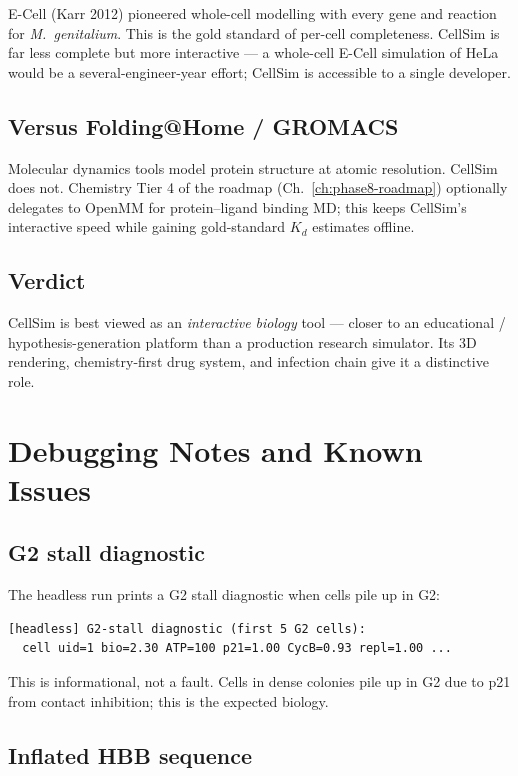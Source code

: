 \documentclass[11pt,letterpaper,twoside,openany]{book}
\begin{document}
E-Cell (Karr 2012) pioneered whole-cell modelling with every gene
and reaction for \emph{M.\ genitalium}. This is the gold standard
of per-cell completeness. CellSim is far less complete but more
interactive --- a whole-cell E-Cell simulation of HeLa would be a
several-engineer-year effort; CellSim is accessible to a single
developer.

\section{Versus Folding@Home / GROMACS}

Molecular dynamics tools model protein structure at atomic
resolution. CellSim does not. Chemistry Tier 4 of the roadmap
(Ch.~\ref{ch:phase8-roadmap}) optionally delegates to OpenMM for
protein--ligand binding MD; this keeps CellSim's interactive speed
while gaining gold-standard $K_d$ estimates offline.

\section{Verdict}

CellSim is best viewed as an \emph{interactive biology} tool ---
closer to an educational / hypothesis-generation platform than a
production research simulator. Its 3D rendering, chemistry-first
drug system, and infection chain give it a distinctive role.

\chapter{Debugging Notes and Known Issues}
\label{ch:known-issues}

\section{G2 stall diagnostic}

The headless run prints a G2 stall diagnostic when cells pile up
in G2:
\begin{verbatim}
[headless] G2-stall diagnostic (first 5 G2 cells):
  cell uid=1 bio=2.30 ATP=100 p21=1.00 CycB=0.93 repl=1.00 ...
\end{verbatim}
This is informational, not a fault. Cells in dense colonies pile
up in G2 due to p21 from contact inhibition; this is the expected
biology.

\section{Inflated HBB sequence}
\end{document}
